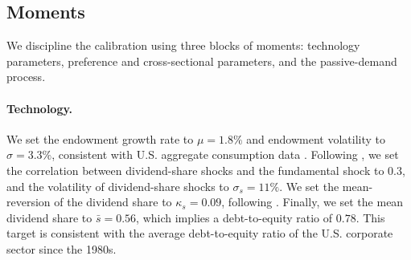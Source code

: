 \documentclass[12pt,english]{article}
\begin{document}
\begin{table}[!t]
    \centering
    \resizebox{.65\linewidth}{!}{}
	\vspace{2mm}
    \captionsetup{font=footnotesize}
    \caption{\textbf{Parameter values.}\\
    This table reports the parameter values used to calibrate the baseline economy.
    Risk aversion parameters and sectoral masses ($\gamma_j$, $\omega_j$) are chosen to match average sectoral wealth shares and sectoral ``betas'' from time-series regressions of risky-asset holdings on aggregate risky supply.
    Technology parameters ($\mu$, $\sigma$, $\sigma_s$, $\bar{s}$, $\kappa_s,\nu_s$), where $\nu_s = \frac{\sigma \sigma_s^\top}{\|\sigma\|\,\|\sigma_s\|}$, are standard macro--finance targets.
    Passive-demand parameters ($\overline{\alpha}$, $\theta_p$, $\sigma_p$, $\nu_p$), where $\nu_p = \frac{\sigma \sigma_p^\top}{\|\sigma\|\,\|\sigma_p\|}$, are disciplined by the average passive portfolio share, household portfolio inertia \citep{brunnermeier2008wealth}, and the volatility and correlation of quarterly aggregate equity flows with market returns \citep{gabaix2020search}.
    The leverage-constraint tightness $\overline{\sigma}$ targets the empirical asset-to-equity ratio of the constrained sector.}\label{tab:calib}
\end{table}

\subsection{Moments}\label{sec:moments}

We discipline the calibration using three blocks of moments: technology parameters, preference and cross-sectional parameters, and the passive-demand process.

\paragraph{Technology.}
We set the endowment growth rate to $\mu = 1.8\%$ and endowment volatility to $\sigma = 3.3\%$, consistent with U.S. aggregate consumption data \citep{campbell1999force}.
Following \citet{LettauWachter2011}, we set the correlation between dividend-share shocks and the fundamental shock to $0.3$, and the volatility of dividend-share shocks to $\sigma_s = 11\%$.
We set the mean-reversion of the dividend share to $\kappa_s = 0.09$, following \citet{santos2006labor}.
Finally, we set the mean dividend share to $\bar{s} = 0.56$, which implies a debt-to-equity ratio of $0.78$.
This target is consistent with the average debt-to-equity ratio of the U.S. corporate sector since the 1980s.
\end{document}
